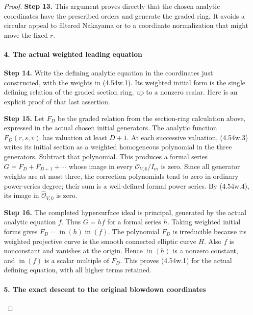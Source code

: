 \begin{proof}
\noindent\textbf{Step 13.} This argument proves directly that the chosen analytic
coordinates have the prescribed orders and generate the
graded ring. It avoids a circular appeal to filtered
Nakayama or to a coordinate normalization that might move
the fixed \(r\).

\paragraph{4. The actual weighted leading equation}

\noindent\textbf{Step 14.} Write the defining analytic equation in the coordinates just
constructed, with the weights in (4.54w.1). Its weighted initial
form is the single defining relation of the graded section
ring, up to a nonzero scalar. Here is an explicit proof of that
last assertion.

\noindent\textbf{Step 15.} Let \(F_D\) be the graded relation from the section-ring calculation above, expressed
in the actual chosen initial generators. The analytic function
\(F_D(r,s,v)\) has valuation at least \(D+1\).
At each successive valuation, (4.54w.3) writes its initial
section as a weighted homogeneous polynomial in the three
generators. Subtract that polynomial. This produces a formal
series \(G=F_D+F_{D+1}+\cdots\) whose image in every
\(\mathcal O_{V,0}/I_m\) is zero. Since all generator
weights are at most three, the correction polynomials tend
to zero in ordinary power-series degree; their sum is a
well-defined formal power series. By (4.54w.4), its image in
\(\widehat{\mathcal O}_{V,0}\) is zero.

\noindent\textbf{Step 16.} The completed hypersurface ideal is principal, generated by
the actual analytic equation \(f\). Thus \(G=h f\) for
a formal series \(h\). Taking weighted initial forms gives
\(F_D=\operatorname{in}(h)\operatorname{in}(f)\).
The polynomial \(F_D\) is irreducible because its weighted
projective curve is the smooth connected elliptic curve
\(H\). Also \(f\) is nonconstant and vanishes at the
origin. Hence \(\operatorname{in}(h)\) is a nonzero
constant, and \(\operatorname{in}(f)\) is a scalar multiple
of \(F_D\). This proves (4.54w.1) for the actual defining
equation, with all higher terms retained.

\paragraph{5. The exact descent to the original blowdown coordinates}


\end{proof}
